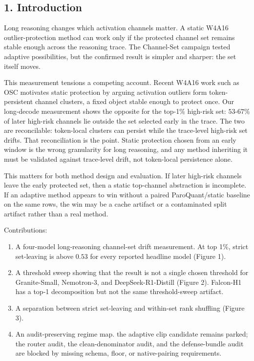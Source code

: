 \documentclass{article}
\begin{document}
\hypertarget{introduction}{%
\subsection{1. Introduction}\label{introduction}}

Long reasoning changes which activation channels matter. A static W4A16
outlier-protection method can work only if the protected channel set
remains stable enough across the reasoning trace. The Channel-Set
campaign tested adaptive possibilities, but the confirmed result is
simpler and sharper: the set itself moves.

This measurement tensions a competing account. Recent W4A16 work such as
OSC \citep{osc2026} motivates static protection by arguing activation
outliers form token-persistent channel clusters, a fixed object stable
enough to protect once. Our long-decode measurement shows the opposite
for the top-1\% high-risk set: \(53\)-\(67\)\% of later
high-risk channels lie outside the set selected early in the trace. The
two are reconcilable: token-local clusters can persist while the
trace-level high-risk set drifts. That reconciliation is the point.
Static protection chosen from an early window is the wrong granularity
for long reasoning, and any method inheriting it must be validated
against trace-level drift, not token-local persistence alone.

This matters for both method design and evaluation. If later high-risk
channels leave the early protected set, then a static top-channel
abstraction is incomplete. If an adaptive method appears to win without
a paired ParoQuant/static baseline on the same rows, the win may be a
cache artifact or a contaminated split artifact rather than a real
method.

Contributions:

\begin{enumerate}
\def\labelenumi{\arabic{enumi}.}
\item
  A four-model long-reasoning channel-set drift measurement. At top 1\%,
  strict set-leaving is above \(0.53\) for every reported headline
  model (Figure 1).
\item
  A threshold sweep showing that the result is not a single chosen
  threshold for Granite-Small, Nemotron-3, and DeepSeek-R1-Distill
  (Figure 2). Falcon-H1 has a top-1 decomposition but not the same
  threshold-sweep artifact.
\item
  A separation between strict set-leaving and within-set rank shuffling
  (Figure 3).
\item
  An audit-preserving regime map. the adaptive clip candidate remains
  parked; the router audit, the clean-denominator audit, and the
  defense-bundle audit are blocked by missing schema, floor, or
  native-pairing requirements.
\end{enumerate}
\end{document}
